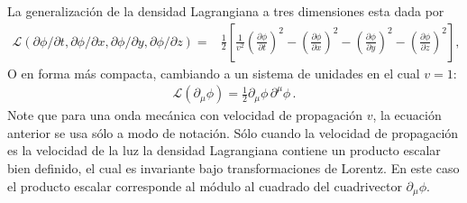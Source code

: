 \begin{frame}
La generalización de la densidad Lagrangiana a tres dimensiones esta dada por
\begin{align}
  \label{eq:dlc3d}
  \mathcal{L}(\partial\phi/\partial t,\partial\phi/\partial x,\partial\phi/\partial y,\partial\phi/\partial z)
=&\frac{1}{2}
\left[
  \frac{1}{v^2}\left(\frac{\partial\phi}{\partial t}\right)^2-\left(\frac{\partial\phi}{\partial x}\right)^2-\left(\frac{\partial\phi}{\partial y}\right)^2-\left(\frac{\partial\phi}{\partial z}\right)^2
\right],
\end{align}
O en forma más compacta, cambiando a un sistema de unidades en el cual $v=1$:
\begin{align}
  \mathcal{L}(\partial_{\mu} \phi)=  \frac{1}{2}{\partial_\mu\phi}\,{\partial^\mu\phi}\,.
\end{align}
Note que para una onda mecánica con velocidad de propagación $v$, la ecuación anterior se usa sólo a modo de notación. Sólo cuando la velocidad de propagación es la velocidad de la luz la densidad Lagrangiana contiene un producto escalar bien definido, el cual es invariante bajo transformaciones de Lorentz. En este caso el producto escalar corresponde al módulo al cuadrado del cuadrivector $\partial_{\mu}\phi$.
\end{frame}


